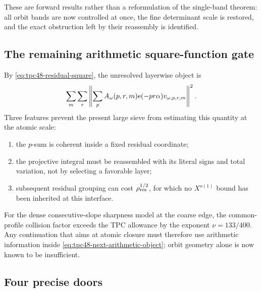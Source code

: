 These are forward results rather than a reformulation of the
single-band theorem: all orbit bands are now controlled at once, the
fine determinant scale is restored, and the exact obstruction left by
their reassembly is identified.

\subsection{The remaining arithmetic square-function gate}

By \eqref{eq:tpc48-residual-square}, the unresolved layerwise object is
\begin{equation}
 \sum_m\sum_r
 \left\|
 \sum_p A_\omega(p,r,m)\mathrm e(-pr\alpha)
 v_{\omega,p,r,m}
 \right\|^2.
 \label{eq:tpc48-next-arithmetic-object}
\end{equation}
Three features prevent the present large sieve from estimating this
quantity at the atomic scale:
\begin{enumerate}[label=\textup{(\alph*)},leftmargin=2.4em]
 \item the \(p\)-sum is coherent inside a fixed residual coordinate;
 \item the projective integral must be reassembled with its literal
       signs and total variation, not by selecting a favorable layer;
 \item subsequent residual grouping can cost
       \(\rho_{\rm res}^{1/2}\), for which no \(X^{o(1)}\) bound has
       been inherited at this interface.
\end{enumerate}
For the dense consecutive-slope sharpness model at the coarse edge,
the common-profile collision factor exceeds the TPC allowance by the
exponent \(\nu=133/400\).  Any continuation
that aims at atomic closure must therefore use arithmetic information
inside \eqref{eq:tpc48-next-arithmetic-object}; orbit geometry alone is
now known to be insufficient.

\subsection{Four precise doors}

